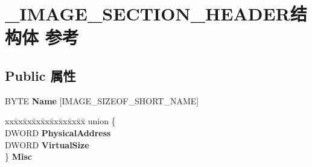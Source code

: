 \hypertarget{struct___i_m_a_g_e___s_e_c_t_i_o_n___h_e_a_d_e_r}{}\section{\+\_\+\+I\+M\+A\+G\+E\+\_\+\+S\+E\+C\+T\+I\+O\+N\+\_\+\+H\+E\+A\+D\+E\+R结构体 参考}
\label{struct___i_m_a_g_e___s_e_c_t_i_o_n___h_e_a_d_e_r}
\subsection*{Public 属性}
\begin{DoxyCompactItemize}
\item 
\mbox{\label{struct___i_m_a_g_e___s_e_c_t_i_o_n___h_e_a_d_e_r_aac2dde6f96c68acea077b3e556e583e0}} 
B\+Y\+TE {\bfseries Name} \mbox{[}I\+M\+A\+G\+E\+\_\+\+S\+I\+Z\+E\+O\+F\+\_\+\+S\+H\+O\+R\+T\+\_\+\+N\+A\+ME\mbox{]}
\item 
\mbox{\label{struct___i_m_a_g_e___s_e_c_t_i_o_n___h_e_a_d_e_r_aba2f32d51ae8f7238916f962d9c996db}} 
\begin{tabbing}
xx\=xx\=xx\=xx\=xx\=xx\=xx\=xx\=xx\=\kill
union \{\\
\>DWORD {\bfseries PhysicalAddress}\\
\>DWORD {\bfseries VirtualSize}\\
\} {\bfseries Misc}\\


\end{tabbing}
\end{DoxyCompactItemize}
